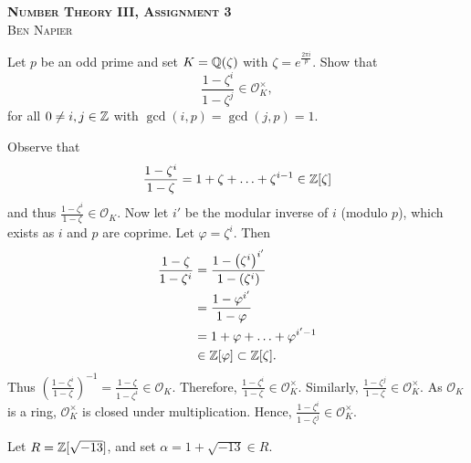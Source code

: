 \documentclass[a4paper, answers]{exam}
\begin{document}
\begin{center}
	\textbf{\textsc{Number Theory III, Assignment 3}}
	\\
	\textsc{Ben Napier}
	\vspace{1em}
\end{center}
\begin{questions}
	\question 
	Let $p$ be an odd prime and set $K = \mathbb{Q}(\zeta)$
	with $\zeta = e^{\frac{2\pi i}p}$.
	Show that
	\[
		\frac{1 - \zeta^i}{1 - \zeta^j}
		\in \mathcal O^\times_K,
	\]
	for all $0 \neq i, j \in \mathbb{Z}$
	with $\gcd(i,p) = \gcd(j,p) = 1$.
	\begin{solution}
		Observe that
		\[
			\frac{1 - \zeta^i}{1 - \zeta} 
			= 1 + \zeta + \ldots + \zeta^{i-1}
			\in \mathbb{Z}[\zeta]
		\]
		and thus 
		$\frac{1 - \zeta^i}{1 - \zeta} \in \mathcal O_K$.
		Now let $i'$ be the modular inverse of $i$ (modulo $p$),
		which exists as $i$ and $p$ are coprime.
		Let $\varphi = \zeta^i$. 
		Then
		\begin{align*}
			\frac{1 - \zeta}{1 - \zeta^i}
			&= \frac{1 - \left( 
				\zeta^i
			\right)^{i'}}{1 - \left( 
				\zeta^i
			\right)} \\
			&= \frac{1 - \varphi^{i'}}{1 - \varphi} \\
			&= 1 + \varphi + \ldots + \varphi^{i' - 1} \\
			&\in \mathbb{Z}[\varphi] \subset \mathbb{Z}[\zeta].
		\end{align*}
		Thus $\left( 
			\frac{1 - \zeta^i}{1 - \zeta} 
		\right)^{-1} = \frac{1 - \zeta}{1 - \zeta^i}
		\in \mathcal O_K$.
		Therefore,
		$\frac{1 - \zeta^i}{1 - \zeta} \in \mathcal O_K^\times$.
		Similarly,
		$\frac{1 - \zeta^j}{1 - \zeta} \in \mathcal O_K^\times$.
		As $\mathcal O_K$ is a ring, $\mathcal O_K^\times$ is closed
		under multiplication.
		Hence,
		$
			\frac{1 - \zeta^i}{1 - \zeta^j} \in \mathcal O_K^\times
		$.
	\end{solution}

	\question
	Let $R = \mathbb{Z}[\sqrt{-13}]$,
	and set $\alpha = 1 + \sqrt{-13} \in R$.
\end{questions}
\end{document}
